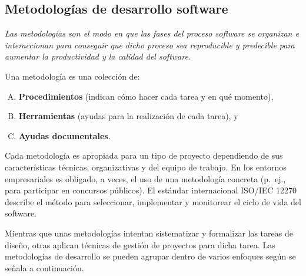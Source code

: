 \subsection{Metodologías de desarrollo software}
\emph{Las metodologías son el modo en que las fases del proceso software se organizan e interaccionan para conseguir que dicho proceso sea reproducible y predecible para aumentar la productividad y la calidad del software.}

Una metodología es una colección de:

\begin{enumerate}[A.]
\item \textbf{Procedimientos} (indican cómo hacer cada tarea y en qué momento),
\item \textbf{Herramientas} (ayudas para la realización de cada tarea), y
\item \textbf{Ayudas documentales}.
\end{enumerate}

Cada metodología es apropiada para un tipo de proyecto dependiendo de sus 
características técnicas, organizativas y del equipo de trabajo. En los 
entornos empresariales es obligado, a veces, el uso de una metodología 
concreta (p.~ej., para participar en concursos públicos). El estándar 
internacional ISO/IEC 12270 describe el método para 
seleccionar, implementar y monitorear el ciclo de vida del software.

Mientras que unas metodologías intentan sistematizar y formalizar las tareas de diseño, otras aplican técnicas de gestión de proyectos para dicha tarea. Las metodologías de desarrollo se pueden agrupar dentro de varios enfoques según se señala a continuación.

